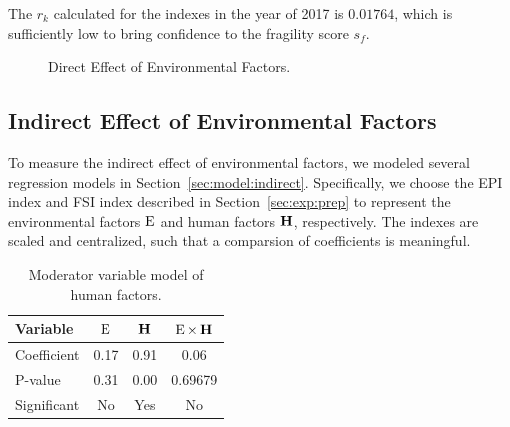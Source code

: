 The $r_k$ calculated for the indexes in the year of 2017 is $0.01764$, which is sufficiently low to bring confidence to the fragility score $s_f$.

\begin{figure}[htbp]
    \centering
    \caption{Direct Effect of Environmental Factors.}
\end{figure}

\subsection{Indirect Effect of Environmental Factors}

To measure the indirect effect of environmental factors, we modeled several regression models in Section~\ref{sec:model:indirect}. Specifically, we choose the EPI index and FSI index described in Section~\ref{sec:exp:prep} to represent the environmental factors $\operatorname*{E}$ and human factors $\operatorname*{\mathbf{H}}$, respectively. The indexes are scaled and centralized, such that a comparsion of coefficients is meaningful.
\begin{table}[htbp]
    \centering
   \begin{tabular}{|l|ccc|} \hline
      Variable & $\operatorname*{E}$ & $\operatorname*{\mathbf{H}}$ & $\operatorname*{E}\times\operatorname*{\mathbf{H}}$ \\ \hline
      Coefficient & 0.17 & 0.91 & 0.06 \\ \hline
      P-value & 0.31 & 0.00 & 0.69679 \\ \hline
      Significant & No & Yes & No  \\ \hline
   \end{tabular} 
   \caption{Moderator variable model of human factors.}
   \label{tab:exp:moderator}
\end{table}

